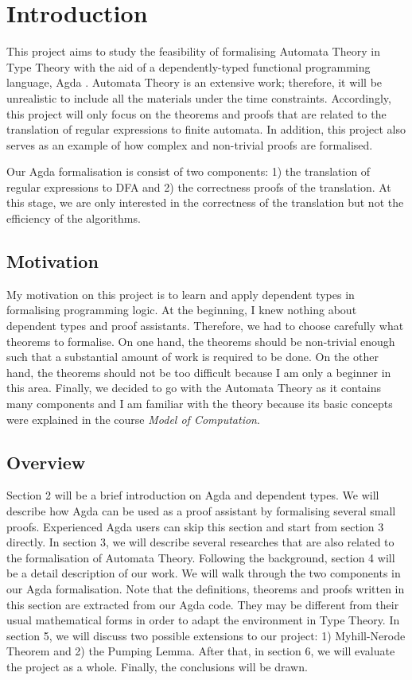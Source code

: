 \section{Introduction}
\par This project aims to study the feasibility of formalising
Automata Theory \cite{aho1972} in Type Theory \cite{martin1984} with the aid of a dependently-typed
functional programming language, Agda \cite{agdawiki2016}. Automata
Theory is an extensive work; therefore, it will be unrealistic to
include all the materials under the time constraints. Accordingly, this project will only focus on the theorems and
proofs that are related to the translation of regular expressions
to finite automata. In addition, this project also serves as an
example of how complex and non-trivial proofs are formalised. 

\par Our Agda formalisation is consist of two components: 1) the
translation of regular expressions to DFA and 2)
the correctness proofs of the translation. At this stage, we are only
interested in the correctness of the translation but not the
efficiency of the algorithms. 


\subsection{Motivation}
\par My motivation on this project is to learn and apply
dependent types in formalising programming logic. At the beginning, I
knew nothing about dependent types and proof assistants. Therefore, we
had to choose carefully what theorems to formalise. On one hand, the theorems
should be non-trivial enough such that a substantial amount of work is required
to be done. On the other hand, the theorems should not be too
difficult because I am only a beginner in this area. Finally, we
decided to go with the Automata Theory as it contains many components
and I am familiar with the theory because its basic concepts were
explained in the course \textit{Model of Computation}. 


\subsection{Overview}
\par Section 2 will be a brief introduction on Agda and
dependent types. We will describe how Agda can be used as a proof
assistant by formalising several small proofs. Experienced Agda
users can skip this section and start from section 3 directly. In
section 3, we will describe several researches
that are also related to the formalisation of Automata
Theory. Following the background, section 4 will be a detail description of our
work. We will walk through the two components in our Agda
formalisation. Note that the definitions,
theorems and proofs written in this section are extracted from our
Agda code. They may be different from
their usual mathematical forms in order to adapt the environment in
Type Theory. In section 5, we will discuss two possible extensions
to our project: 1) Myhill-Nerode Theorem and 2) the Pumping
Lemma. After that, in section 6, we will evaluate the project as a
whole. Finally, the conclusions will be drawn. 